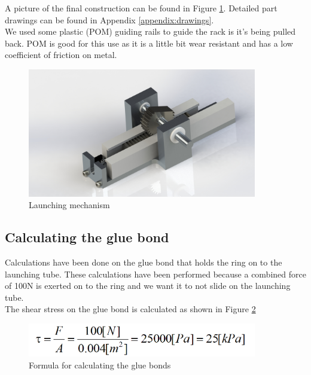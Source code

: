 \documentclass[11pt,twoside,a4paper]{report}
\begin{document}
A picture of the final construction can be found in Figure \ref{fig:launmech}. Detailed part drawings can be found in Appendix \ref{appendix:drawings}.\\
We used some plastic (POM) guiding rails to guide the rack is it\rq{}s being pulled back. POM is good for this use as it is a little bit wear resistant and has a low coefficient of friction on metal.\\

\begin{figure}[H]
\begin{center}
\includegraphics[width = 10cm]{Images/launchmech.jpg}
\caption{Launching mechanism}
\label{fig:launmech}
\end{center}
\end{figure}

\subsection{Calculating the glue bond}

Calculations have been done on the glue bond that holds the ring on to the launching tube. These calculations have been performed because a combined force of 100N is exerted on to the ring and we want it to not slide on the launching tube.\\
The shear stress on the glue bond is calculated as shown in Figure \ref{fig:gluebond}

\begin{figure}[H]
\begin{center}
\includegraphics[width = 10cm]{Images/formule_lijm.jpg}
\caption{Formula for calculating the glue bonds}
\label{fig:gluebond}
\end{center}
\end{figure}
\end{document}

